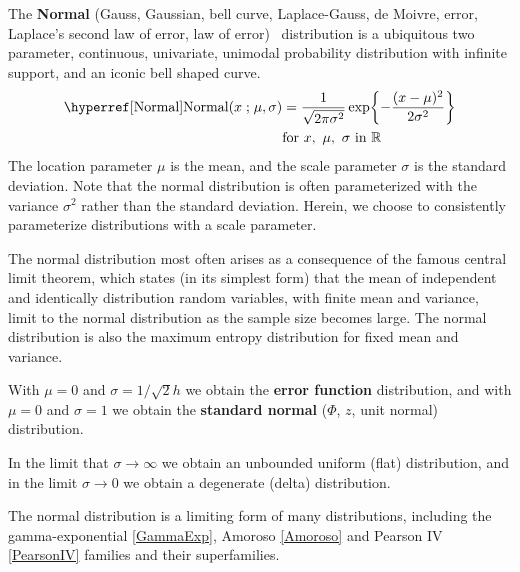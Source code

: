 

\label{sec:Normal}
The  {\bf Normal} (Gauss, Gaussian, bell curve, Laplace-Gauss, de Moivre, error, Laplace's second law of error, law of error)~\cite{Moivre1733,Johnson1994} distribution is a ubiquitous two parameter, continuous, univariate, unimodal probability distribution with infinite support, and an iconic bell shaped curve. 
%
\begin{align}
\label{Normal}
\opr{Normal}(x\given \mu,\sigma) 
&=
\frac{1}{\sqrt{2 \pi \sigma^2}}  \exp\Left\{ - \frac{( x-\mu)^2}{2\sigma^2} \Right\} \checked
\\
& \text{for } x,\ \mu,\  \sigma \text{ in }  \mathbb{R}						\checked 
\notag
\end{align}
The location parameter $\mu$ is the mean, and the scale parameter $\sigma$ is the standard deviation. Note that the normal distribution is often parameterized with the variance $\sigma^2$ rather than the standard deviation. Herein, we choose to consistently parameterize distributions with a scale parameter.  

The normal distribution most often arises as a consequence of the famous central limit theorem, which states (in its simplest form) that the mean of independent and identically distribution random variables, with finite mean and variance, limit to the normal distribution as the sample size becomes large. 
The normal distribution is also the maximum entropy distribution for fixed mean and variance.




With $\mu=0$ and $\sigma = 1/ \sqrt{2} h$ we obtain the {\bf error function} distribution, and
with $\mu=0$ and $\sigma=1$ we obtain the {\bf standard normal} ($\Phi$, $z$, unit normal)  distribution. 


 In the limit that $\sigma\rightarrow\infty$ we obtain an unbounded uniform (flat) distribution, and in the limit $\sigma\rightarrow0$ we obtain a degenerate (delta) distribution. 
 
The normal distribution is a limiting form of many distributions, including the gamma-exponential \eqref{GammaExp}, Amoroso \eqref{Amoroso} and Pearson IV \eqref{PearsonIV} families and their superfamilies. 



